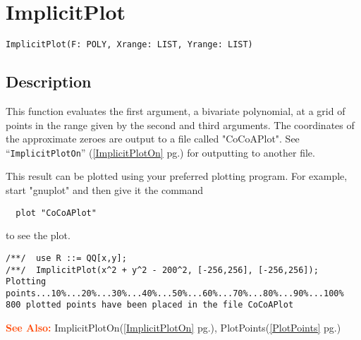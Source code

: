 \documentclass[a4paper]{mybook}
\newenvironment{command}{}{} %
\newcommand\SeeAlso{\par\textcolor{OrangeRed}{\textbf{\large See Also: }}}
\begin{document}
\section{ImplicitPlot}
\label{ImplicitPlot}
\begin{command} %


\begin{Verbatim}[label=syntax, rulecolor=\color{MidnightBlue},
frame=single]
ImplicitPlot(F: POLY, Xrange: LIST, Yrange: LIST)
\end{Verbatim}


\subsection*{Description}

This function evaluates the first argument, a bivariate polynomial, at
a grid of points in the range given by the second and third arguments.
The coordinates of the approximate zeroes are output to a file
called "CoCoAPlot".
See ``\verb&ImplicitPlotOn&'' (\ref{ImplicitPlotOn} pg.\pageref{ImplicitPlotOn}) for outputting to another file.
\par 
This result can be plotted using your preferred plotting program.
For example, start "gnuplot" and then give it the command
\begin{verbatim}  plot "CoCoAPlot"\end{verbatim}
to see the plot.
\begin{Verbatim}[label=example, rulecolor=\color{PineGreen}, frame=single]
/**/  use R ::= QQ[x,y];
/**/  ImplicitPlot(x^2 + y^2 - 200^2, [-256,256], [-256,256]);
Plotting points...10%...20%...30%...40%...50%...60%...70%...80%...90%...100%
800 plotted points have been placed in the file CoCoAPlot
\end{Verbatim}



\SeeAlso %
  ImplicitPlotOn(\ref{ImplicitPlotOn} pg.\pageref{ImplicitPlotOn}), 
    PlotPoints(\ref{PlotPoints} pg.\pageref{PlotPoints})
\end{command} %
\end{document}
